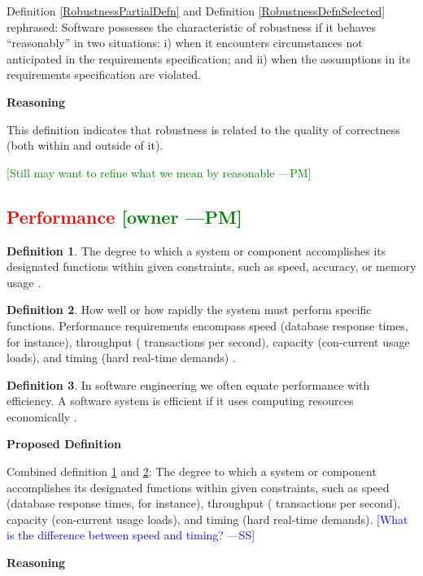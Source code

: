 \documentclass[letterpaper,cleveref]{lipics-v2019}
\newcommand{\authornote}[3]{\textcolor{#1}{[#3 ---#2]}}
\newcommand{\authornote}[3]{}
\newcommand{\wss}[1]{\authornote{blue}{SS}{#1}} %
\newcommand{\pmi}[1]{\authornote{green}{PM}{#1}} %
\newcommand{\notdone}[1]{\textcolor{red}{#1}}
\theoremstyle{definition}
\newtheorem{defn}{Definition}
\begin{document}
Definition \ref{RobustnessPartialDefn} and Definition
\ref{RobustnessDefnSelected} rephrased: Software possesses the
characteristic of robustness if it behaves ``reasonably'' in two situations: i)
when it encounters circumstances not anticipated in the requirements
specification; and ii) when the assumptions in its requirements specification
are violated.

\noindent \textbf{Reasoning}

This definition indicates that robustness is related to the quality of
correctness (both within and outside of it). 

\pmi{Still may want to refine what we mean by reasonable}

\subsection{\notdone{Performance} \pmi{owner}}

\begin{defn} \label{PerformanceDefnSelected}
	The degree to which a system or component accomplishes its designated functions
	within given constraints, such as speed, accuracy, or memory usage
	\citep{IEEEStdGlossarySET1990}.
\end{defn}
\begin{defn} \label{PerformanceDefnSelected2}
	How well or how rapidly the system must perform specific functions. Performance
	requirements encompass speed (database response times, for instance), throughput
	( transactions per second), capacity (con-current usage loads), and timing (hard
	real-time demands) \citep{wiegers2003softreq}.
\end{defn}
\begin{defn}
	In software engineering we often equate performance with efficiency. A software
	system is efficient if it uses computing resources economically
	\citep{ghezzi1991fundamentals}.
\end{defn}

\noindent \textbf{Proposed Definition}

Combined definition \ref{PerformanceDefnSelected} and
\ref{PerformanceDefnSelected2}: The degree to which a system or component
accomplishes its designated functions within given constraints, such as speed
(database response times, for instance), throughput ( transactions per second),
capacity (con-current usage loads), and timing (hard real-time
demands). \wss{What is the difference between speed and timing?}

\noindent \textbf{Reasoning}
\end{document}
